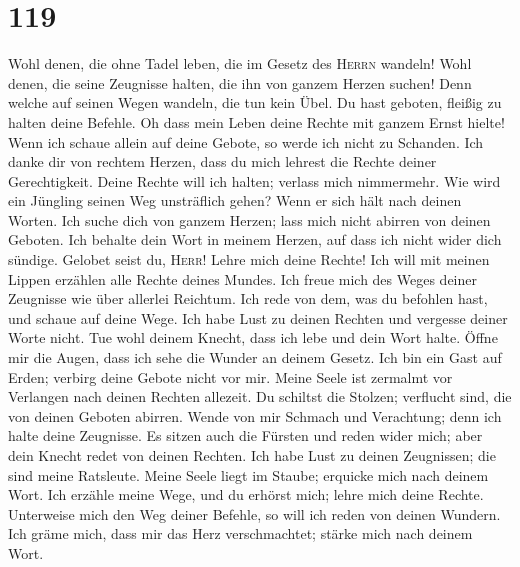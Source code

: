 \hypertarget{section-118}{%
\section{119}\label{section-118}}

 Wohl denen, die ohne Tadel leben, die im Gesetz des
\textsc{Herrn} wandeln!  Wohl denen, die seine Zeugnisse
halten, die ihn von ganzem Herzen suchen!  Denn welche auf
seinen Wegen wandeln, die tun kein Übel.  Du hast geboten,
fleißig zu halten deine Befehle.  Oh dass mein Leben deine
Rechte mit ganzem Ernst hielte!  Wenn ich schaue allein
auf deine Gebote, so werde ich nicht zu Schanden.  Ich
danke dir von rechtem Herzen, dass du mich lehrest die Rechte deiner
Gerechtigkeit.  Deine Rechte will ich halten; verlass mich
nimmermehr.  Wie wird ein Jüngling seinen Weg unsträflich
gehen? Wenn er sich hält nach deinen Worten.  Ich suche
dich von ganzem Herzen; lass mich nicht abirren von deinen Geboten.
 Ich behalte dein Wort in meinem Herzen, auf dass ich
nicht wider dich sündige.  Gelobet seist du,
\textsc{Herr}! Lehre mich deine Rechte!  Ich will mit
meinen Lippen erzählen alle Rechte deines Mundes.  Ich
freue mich des Weges deiner Zeugnisse wie über allerlei Reichtum.
 Ich rede von dem, was du befohlen hast, und schaue auf
deine Wege.  Ich habe Lust zu deinen Rechten und vergesse
deiner Worte nicht.  Tue wohl deinem Knecht, dass ich
lebe und dein Wort halte.  Öffne mir die Augen, dass ich
sehe die Wunder an deinem Gesetz.  Ich bin ein Gast auf
Erden; verbirg deine Gebote nicht vor mir.  Meine Seele
ist zermalmt vor Verlangen nach deinen Rechten allezeit. 
Du schiltst die Stolzen; verflucht sind, die von deinen Geboten abirren.
 Wende von mir Schmach und Verachtung; denn ich halte
deine Zeugnisse.  Es sitzen auch die Fürsten und reden
wider mich; aber dein Knecht redet von deinen Rechten. 
Ich habe Lust zu deinen Zeugnissen; die sind meine Ratsleute.
 Meine Seele liegt im Staube; erquicke mich nach deinem
Wort.  Ich erzähle meine Wege, und du erhörst mich; lehre
mich deine Rechte.  Unterweise mich den Weg deiner
Befehle, so will ich reden von deinen Wundern.  Ich gräme
mich, dass mir das Herz verschmachtet; stärke mich nach deinem Wort.
